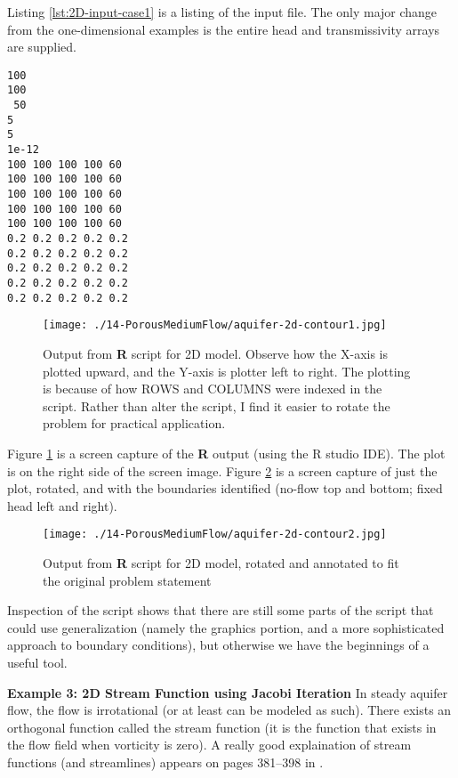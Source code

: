 Listing \ref{lst:2D-input-case1} is a listing of the input file.  The only major change from the one-dimensional examples is the entire head and transmissivity arrays are supplied.  

\begin{lstlisting}[caption= Input File for Example Problem \\ , label=lst:2D-input-case1]
100
100
 50
5
5
1e-12
100 100 100 100 60
100 100 100 100 60
100 100 100 100 60
100 100 100 100 60
100 100 100 100 60
0.2 0.2 0.2 0.2 0.2
0.2 0.2 0.2 0.2 0.2
0.2 0.2 0.2 0.2 0.2
0.2 0.2 0.2 0.2 0.2
0.2 0.2 0.2 0.2 0.2
\end{lstlisting}

\begin{figure}[h!] %
   \centering
   \texttt{[image: ./14-PorousMediumFlow/aquifer-2d-contour1.jpg]} 
   \caption{Output from \textbf{R} script for 2D model.  Observe how the X-axis is plotted upward, and the Y-axis is plotter left to right.  The plotting is because of how ROWS and COLUMNS were indexed in the script.  Rather than alter the script, I find it easier to rotate the problem for practical application.}
   \label{fig:aquifer-2d-contour1}
\end{figure}
Figure \ref{fig:aquifer-2d-contour1} is a screen capture of the \textbf{R} output (using the R studio IDE).   The plot is on the right side of the screen image.
Figure \ref{fig:aquifer-2d-contour2} is a screen capture of just the plot, rotated, and with the boundaries identified (no-flow top and bottom; fixed head left and right).

\begin{figure}[h!] %
   \centering
   \texttt{[image: ./14-PorousMediumFlow/aquifer-2d-contour2.jpg]} 
   \caption{Output from \textbf{R} script for 2D model, rotated and annotated to fit the original problem statement}
   \label{fig:aquifer-2d-contour2}
\end{figure}

Inspection of the script shows that there are still some parts of the script that could use generalization (namely the graphics portion, and a more sophisticated approach to boundary conditions), but otherwise we have the beginnings of a useful tool.   

\textbf{Example 3: 2D Stream Function using Jacobi Iteration}
In steady aquifer flow, the flow is irrotational (or at least can be modeled as such). 
There exists an orthogonal function called the stream function (it is the function that exists in the flow field when vorticity is zero).
A really good explaination of stream functions (and streamlines) appears on pages 381--398 in \cite{Zheng1995}.

